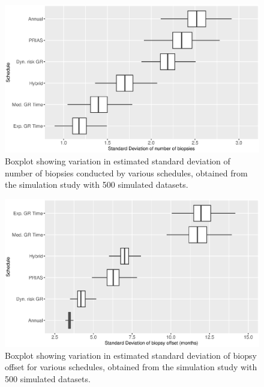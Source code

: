 \begin{figure}[!htb]
\centerline{\includegraphics[width=\columnwidth]{images/sim_study/nbSDBoxPlot_all.eps}}
\caption{Boxplot showing variation in estimated standard deviation of number of biopsies conducted by various schedules, obtained from the simulation study with 500 simulated datasets.}
\label{fig : nbSDBoxPlot_all}
\end{figure}

\begin{figure}[!htb]
\centerline{\includegraphics[width=\columnwidth]{images/sim_study/offsetSDBoxPlot_all.eps}}
\caption{Boxplot showing variation in estimated standard deviation of biopsy offset for various schedules, obtained from the simulation study with 500 simulated datasets.}
\label{fig : offsetSDBoxPlot_all}
\end{figure}




